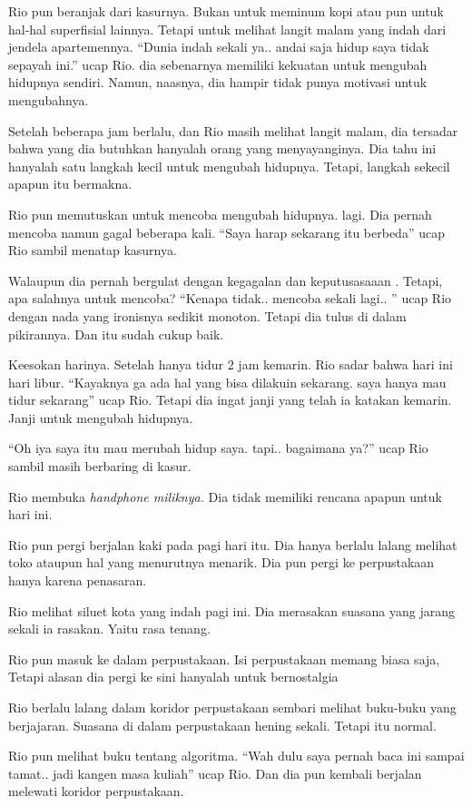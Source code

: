 Rio pun beranjak dari kasurnya. Bukan untuk meminum kopi atau pun untuk hal-hal superfisial lainnya. Tetapi untuk melihat langit malam yang indah dari jendela apartemennya. ``Dunia indah sekali ya.. andai saja hidup saya tidak sepayah ini.'' ucap Rio. dia sebenarnya memiliki kekuatan untuk mengubah hidupnya sendiri. Namun, naasnya, dia hampir tidak punya motivasi untuk mengubahnya.


Setelah beberapa jam berlalu, dan Rio masih melihat langit malam, dia tersadar bahwa yang dia butuhkan hanyalah orang yang menyayanginya. Dia tahu ini hanyalah satu langkah kecil untuk mengubah hidupnya. Tetapi, langkah sekecil apapun itu bermakna.


Rio pun memutuskan untuk mencoba mengubah hidupnya. lagi. Dia pernah mencoba namun gagal beberapa kali. ``Saya harap sekarang itu berbeda'' ucap Rio sambil menatap kasurnya.


Walaupun dia pernah bergulat dengan kegagalan dan keputusasaaan . Tetapi, apa salahnya untuk mencoba? ``Kenapa tidak.. mencoba sekali lagi.. '' ucap Rio dengan nada yang ironisnya sedikit monoton. Tetapi dia tulus di dalam pikirannya. Dan itu sudah cukup baik.


Keesokan harinya. Setelah hanya tidur 2 jam kemarin. Rio sadar bahwa hari ini hari libur. ``Kayaknya ga ada hal yang bisa dilakuin sekarang. saya hanya mau tidur sekarang'' ucap Rio. Tetapi dia ingat janji yang telah ia katakan kemarin. Janji untuk mengubah hidupnya.


``Oh iya saya itu mau merubah hidup saya. tapi.. bagaimana ya?'' ucap Rio sambil masih berbaring di kasur.


Rio membuka \textit{handphone miliknya.} Dia tidak memiliki rencana apapun untuk hari ini.


Rio pun pergi berjalan kaki pada pagi hari itu. Dia hanya berlalu lalang melihat toko ataupun hal yang menurutnya menarik. Dia pun pergi ke perpustakaan hanya karena penasaran.


Rio melihat siluet kota yang indah pagi ini. Dia merasakan suasana yang jarang sekali ia rasakan. Yaitu rasa tenang.


Rio pun masuk ke dalam perpustakaan. Isi perpustakaan memang biasa saja, Tetapi alasan dia pergi ke sini hanyalah untuk bernostalgia


Rio berlalu lalang dalam koridor perpustakaan sembari melihat buku-buku yang berjajaran. Suasana di dalam perpustakaan hening sekali. Tetapi itu normal.


Rio pun melihat buku tentang algoritma. ``Wah dulu saya pernah baca ini sampai tamat.. jadi kangen masa kuliah'' ucap Rio. Dan dia pun kembali berjalan melewati koridor perpustakaan.



